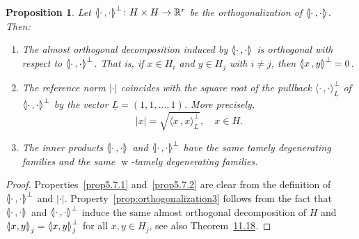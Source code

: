 \documentclass[10pt,a4paper]{amsart}
\newcommand{\llangle}{\mathopen{\langle\mkern -3.1mu\lvert}}
\newcommand{\rrangle}{\mathclose{\rvert\mkern -3.1mu\rangle}}
\newcommand{\highinn}[2]{{\llangle#2\rrangle_{#1}}}
\newcommand{\highinnoneorth}[2]{{\llangle#2\rrangle^{\perp}_{#1}}}
\newcommand{\innoneorth}[2]{{\langle#2\rangle^{\perp}_{#1}}}
\newcommand{\refnorm}[1]{\lvert#1\rvert}
\DeclareMathOperator{\weak}{w}
\newcommand{\R}{\mathbb{R}}
\renewcommand*{\to}{\mathchoice{\longrightarrow}{\rightarrow}{\rightarrow}{\rightarrow}}
\newcommand*{\relabel}{\renewcommand{\labelenumi}{(\theenumi)}}
\newcommand*{\romanenumi}{\renewcommand*{\theenumi}{\roman{enumi}}\relabel}
\newtheorem{prop}[cdrthm]{Proposition}
\theoremstyle{definition}\newtheorem{defi}[cdrthm]{Definition}
\begin{document}
\begin{prop}\label{prop:orthogonalization}
Let $\highinnoneorth{}{\cdot\,,\cdot} \colon H \times H \to \R^r$ be the orthogonalization of $\highinn{}{\cdot\,,\cdot}$. Then:
\begin{enumerate}\romanenumi
\item\label{prop5.7.1} The almost orthogonal decomposition induced by $\highinn{}{\cdot\,,\cdot}$ is orthogonal with respect to $\highinnoneorth{}{\cdot\,,\cdot}$. That is, if $x \in H_i$ and $y \in H_j$ with $i \neq j$, then $\highinnoneorth{}{x\,,y} = 0$.
\item\label{prop5.7.2} The reference norm $\refnorm{\cdot}$ coincides with the square root of the pullback $\innoneorth{\underline L}{\cdot\,,\cdot}$ of $\highinnoneorth{}{\cdot\,,\cdot}$ by the vector $\underline L = (1, 1, \dots, 1)$. More precisely,
\[
\refnorm{x} = \sqrt{\innoneorth{\underline L}{x\,,x}}, \quad x \in H.
\]
\item \label{prop:orthogonalization3}
The inner products $\highinn{}{\cdot\,,\cdot}$ and $\highinnoneorth{}{\cdot\,,\cdot}$ have the same tamely degenerating families and the same $\weak$-tamely degenerating families.
\end{enumerate}
\end{prop}

\begin{proof}
Properties~\eqref{prop5.7.1} and~\eqref{prop5.7.2} are clear from the definition of $\highinnoneorth{}{\cdot\,,\cdot}$ and $\refnorm{\cdot}$. Property~\eqref{prop:orthogonalization3} follows from the fact that $\highinn{}{\cdot\,,\cdot}$ and $\highinnoneorth{}{\cdot\,,\cdot}$ induce the same almost orthogonal decomposition of $H$ and $\highinn{j}{x,y} = \highinnoneorth{j}{x,y}$ for all $x,y \in H_j$, see also Theorem~\href{https://ahl.centre-mersenne.org/articles/10.5802/ahl.257/}{11.18}.
\end{proof}
\end{document}
